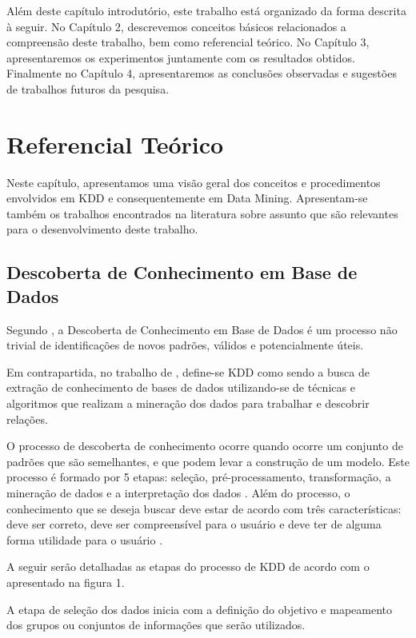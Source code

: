\documentclass[
	12pt,				%
	openright,			%
	oneside,	
	a4paper,				%
	english,				%
	brazil				%
]{abntex2/abntex2} %
\begin{document}
		Além deste capítulo introdutório, este trabalho está organizado da forma descrita à seguir. No Capítulo 2, descrevemos conceitos básicos relacionados a compreensão deste trabalho, bem como referencial teórico. No Capítulo 3, apresentaremos os experimentos juntamente com os resultados obtidos. Finalmente no Capítulo 4, apresentaremos as conclusões observadas e sugestões de trabalhos futuros da pesquisa.

\chapter{Referencial Teórico}

Neste capítulo, apresentamos uma visão geral dos conceitos e procedimentos envolvidos em KDD e consequentemente em Data Mining. Apresentam-se também os trabalhos encontrados na literatura sobre assunto que são relevantes para o desenvolvimento deste trabalho.

	\section{Descoberta de Conhecimento em Base de Dados}
	
	Segundo \cite{fayyad:1996}, a Descoberta de Conhecimento em Base de Dados é um processo não trivial de identificações de novos padrões, válidos e potencialmente úteis.
	
	Em contrapartida, no trabalho de \cite{thome:2002}, define-se KDD como sendo a busca de extração de conhecimento de bases de dados utilizando-se de técnicas e algoritmos que realizam a mineração dos dados para trabalhar e descobrir relações.
	
	O processo de descoberta de conhecimento ocorre quando ocorre um conjunto de padrões que são semelhantes, e que podem levar a construção de um modelo. Este processo é formado por 5 etapas: seleção, pré-processamento, transformação, a mineração de dados e a interpretação dos dados \cite{fayyad:1996}. Além do processo, o conhecimento que se deseja buscar deve estar de acordo com três características: deve ser correto, deve ser compreensível para o usuário e deve ter de alguma forma utilidade para o usuário \cite{freitas:2000}.
	
	A seguir serão detalhadas as etapas do processo de KDD de acordo com o apresentado na figura 1.
	
	A etapa de seleção dos dados inicia com a definição do objetivo e mapeamento  dos grupos ou conjuntos de informações que serão utilizados.
	
\end{document}
